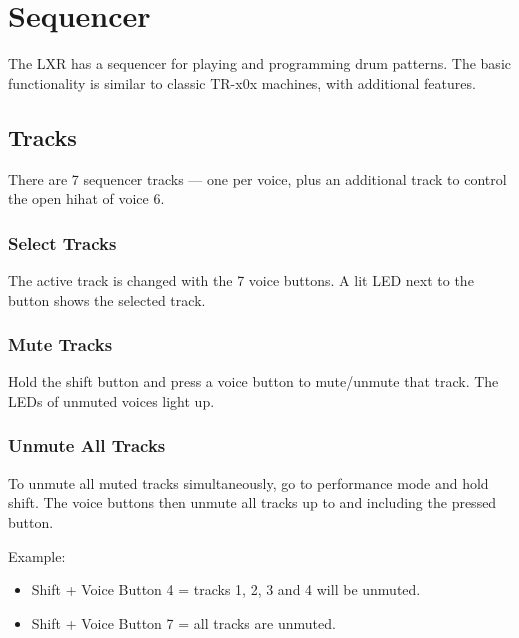 \section{Sequencer}\label{sequencer}

The LXR has a sequencer for playing and programming drum patterns. The
basic functionality is similar to classic TR-x0x machines, with
additional features.

\subsection{Tracks}\label{tracks}

There are 7 sequencer tracks --- one per voice, plus an additional track
to control the open hihat of voice 6.

\subsubsection{Select Tracks}\label{select-tracks}

The active track is changed with the 7 voice buttons. A lit LED next to
the button shows the selected track.

\subsubsection{Mute Tracks}\label{mute-tracks}

Hold the shift button and press a voice button to mute/unmute that
track. The LEDs of unmuted voices light up.


\subsubsection{Unmute All Tracks}\label{unmute-all-tracks}

To unmute all muted tracks simultaneously, go to performance mode and
hold shift. The voice buttons then unmute all tracks up to and including
the pressed button.

Example:

\begin{itemize}
\tightlist
\item
  Shift + Voice Button 4 = tracks 1, 2, 3 and 4 will be unmuted.
\item
  Shift + Voice Button 7 = all tracks are unmuted.
\end{itemize}

